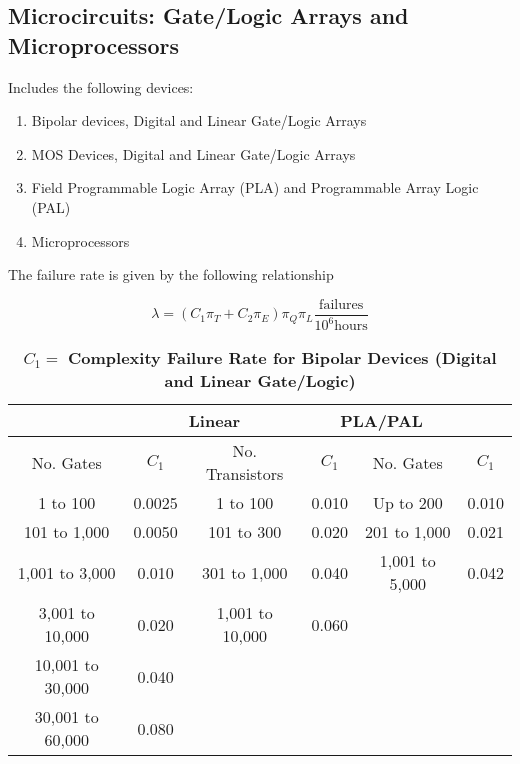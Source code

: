 \newpage

\subsection{Microcircuits: Gate/Logic Arrays and Microprocessors}
\label{subsection:microcircuits-gatelogic-arrays-and-microprocessors}

Includes the following devices:

\begin{enumerate}
\def\labelenumi{\arabic{enumi}.}
\item  Bipolar devices, Digital and Linear Gate/Logic Arrays
\item  MOS Devices, Digital and Linear Gate/Logic Arrays
\item  Field Programmable Logic Array (PLA) and Programmable Array Logic (PAL)
\item  Microprocessors
\end{enumerate}

The failure rate is given by the following relationship

$$\lambda = (C_{1}\pi_{T} + C_{2}\pi_{E}) \pi_{Q} \pi_{L} \frac{\text{failures}}{10^6 \text{hours}}$$



\begin{table}[h]
\caption{ $C_{1} = $ \textbf{Complexity Failure Rate for Bipolar Devices (Digital and Linear Gate/Logic)}}
\label{table:complexFailureRateBjt}
\begin{tabular}{|c|c|c|c|c|c|} \hline
\rowcolor{Gray}
\multicolumn{2}{|c|}{\textbf{Digital}} 	& \multicolumn{2}{c|}{\textbf{Linear}} & \multicolumn{2}{c|}{\textbf{PLA/PAL}} \\ \hline
\rowcolor{Gray}
No. Gates & $C_{1}$ & No. Transistors &$C_{1}$ & No. Gates & $C_{1}$ \\ \hline
1 to 100 			& 0.0025 			& 1 to 100 				& 0.010 		& Up to 200 		& 0.010 		\\ \hline
101 to 1,000		& 0.0050 			& 101 to 300 			& 0.020 		& 201 to 1,000 		& 0.021 		\\ \hline
1,001 to 3,000		& 0.010				& 301 to 1,000 		& 0.040 		& 1,001 to 5,000 	& 0.042 		\\ \hline
3,001 to 10,000 	& 0.020 				& 1,001 to 10,000 	& 0.060 		& 					&			\\ \hline
10,001 to 30,000	& 0.040 				& 					& 				&					&		\\ \hline
30,001 to 60,000	& 0.080 				& 					& 				&					&		\\ \hline
\end{tabular}
\end{table}




